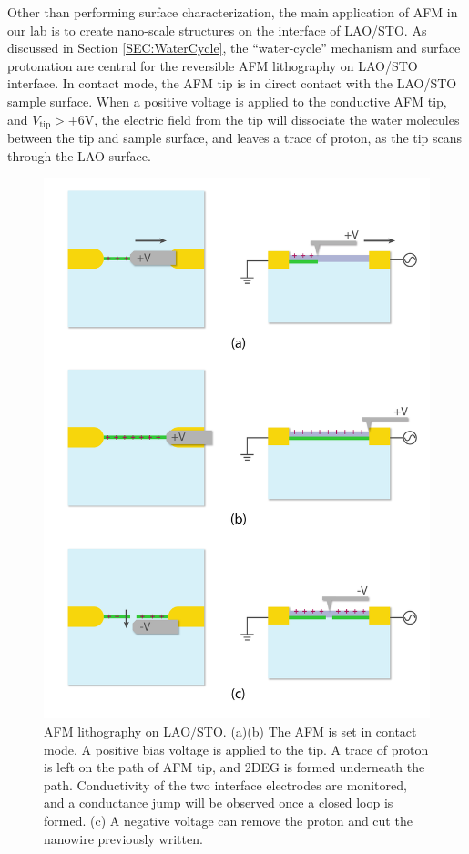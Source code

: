 \documentclass[pdflatex, sectionletters, 12pt]{pittetd}    %
\begin{document}
Other than performing surface characterization, the main application of AFM in our lab is to create nano-scale structures on the interface of LAO/STO. As discussed in Section \ref{SEC:WaterCycle}, the ``water-cycle'' mechanism\cite{bi2010water} and surface protonation\cite{brown2016giant} are central for the reversible AFM lithography on LAO/STO interface. In contact mode, the AFM tip is in direct contact with the LAO/STO sample surface. When a positive voltage is applied to the conductive AFM tip, and $V_\mathrm{tip} > +6$V\cite{cen2008nanoscale}, the electric field from the tip will dissociate the water molecules between the tip and sample surface, and leaves a trace of proton, as the tip scans through the LAO surface. 

\begin{figure}[p]
	\centering
	\includegraphics[width=.80\textwidth]{Drawing/Lithography.pdf}
	\caption{AFM lithography on LAO/STO. (a)(b) The AFM is set in contact mode. A positive bias voltage is applied to the tip. A trace of proton is left on the path of AFM tip, and 2DEG is formed underneath the path. Conductivity of the two interface electrodes are monitored, and a conductance jump will be observed once a closed loop is formed. (c) A negative voltage can remove the proton and cut the nanowire previously written.}
	\label{FIG:Lithography}
\end{figure}
\end{document}
